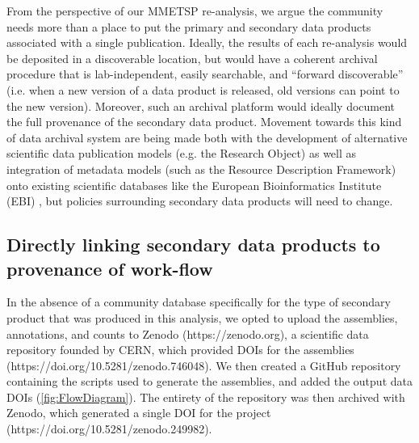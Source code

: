 \documentclass[a4paper,num-refs]{oup-contemporary}
\begin{document}
From the perspective of our MMETSP re-analysis, we argue the community needs more than a place to put the primary and secondary data products associated with a single publication. Ideally, the results of each re-analysis would be deposited in a discoverable location, but would have a coherent archival procedure that is lab-independent, easily searchable, and ``forward discoverable'' (i.e. when a  new version of a data product is released, old versions can point to the new version). Moreover, such an archival platform would ideally document the full provenance of the secondary data product. Movement towards this kind of data archival system are being made both with the development of alternative scientific data publication models (e.g. the Research Object\cite{Bechhofer2013}) as well as integration of metadata models (such as the Resource Description Framework) onto existing scientific databases like the European Bioinformatics Institute (EBI) \cite{Callahan2013}, but policies surrounding secondary data products will need to change.

\subsection{Directly linking secondary data products to provenance of work-flow}


In the absence of a community database specifically for the type of
secondary product that was produced in this analysis, we opted to
upload the assemblies, annotations, and counts to Zenodo
(https://zenodo.org), a scientific data repository founded by CERN,
which provided DOIs for the assemblies (https://doi.org/10.5281/zenodo.746048).
We then created a GitHub
repository containing the scripts used to generate the assemblies, and
added the output data DOIs (\ref{fig:FlowDiagram}).  The entirety of the
repository was then archived with Zenodo, which generated a single DOI
for the project (https://doi.org/10.5281/zenodo.249982).
\end{document}
